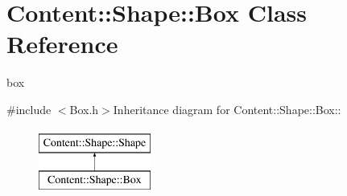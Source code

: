 \hypertarget{classContent_1_1Shape_1_1Box}{
\section{Content::Shape::Box Class Reference}
\label{classContent_1_1Shape_1_1Box}
}


box  


{\ttfamily \#include $<$Box.h$>$}Inheritance diagram for Content::Shape::Box::\begin{figure}[H]
\begin{center}
\leavevmode
\includegraphics[height=2cm]{classContent_1_1Shape_1_1Box}
\end{center}
\end{figure}
